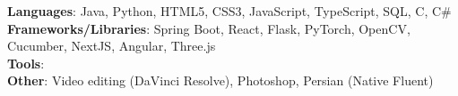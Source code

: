 


\noindent \textbf{Languages}: Java, Python, HTML5, CSS3, JavaScript, TypeScript, SQL, C, C\# \\
\textbf{Frameworks/Libraries}: Spring Boot, React, Flask, PyTorch, OpenCV, Cucumber, NextJS, Angular, Three.js \\
\textbf{Tools}:\hfill
{}
\\
\textbf{Other}: Video editing (DaVinci Resolve), Photoshop, Persian (Native Fluent)

